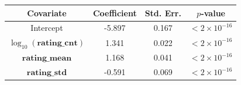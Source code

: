 \documentclass[dvipsnames]{article}
\begin{document}
\begin{table}
    \centering
    \setlength\columnsep{5pt}
    \begin{multicols}{2}
    \begin{tabular}{|c|S[table-format=-1.3]|S[table-format=-1.3]|c|}
    \hline
    {Covariate} & {Coefficient} & {Std. Err.} & {$p$-value} \\
    \hline
    Intercept      & -5.897 & 0.167 & $<2\times 10^{-16}$  \\
    $\log_{10}(\mathbf{rating}\_\mathbf{cnt})$ &  1.341 & 0.022 & $<2\times 10^{-16}$  \\
    $\mathbf{rating}\_\mathbf{mean}$          &  1.168 & 0.041 & $<2\times 10^{-16}$  \\
    $\mathbf{rating}\_\mathbf{std}$       & -0.591 & 0.069 & $<2\times 10^{-16}$  \\
    \hline
    \end{tabular}
    \vspace{4em}
    

\end{multicols}
\end{table}
\end{document}
